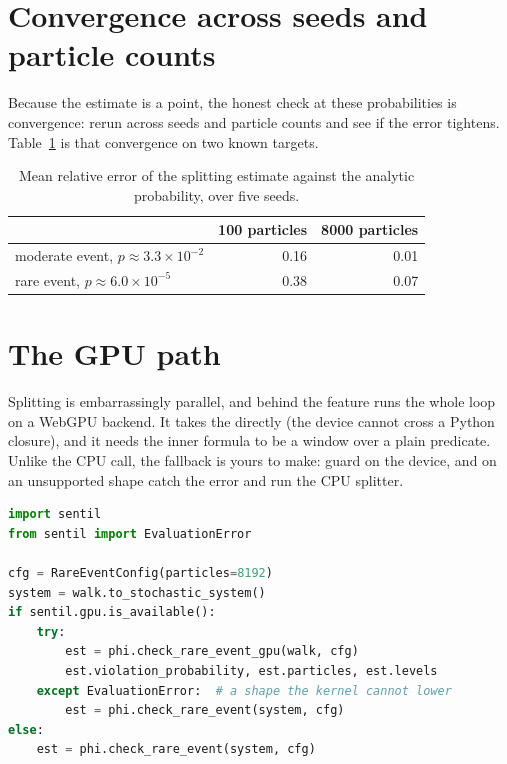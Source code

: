 \section{Convergence across seeds and particle counts}

Because the estimate is a point, the honest check at these probabilities is convergence: rerun across seeds and particle counts and see if the error tightens. Table~\ref{tab:particles} is that convergence on two known targets.

\begin{table}[h]
\centering\small
\renewcommand{\arraystretch}{1.25}
\begin{tabular}{@{}l r r@{}}
\toprule
& \textbf{100 particles} & \textbf{8000 particles}\\
\midrule
moderate event, $p \approx 3.3\times10^{-2}$ & 0.16 & 0.01\\
rare event, $p \approx 6.0\times10^{-5}$ & 0.38 & 0.07\\
\bottomrule
\end{tabular}
\caption{Mean relative error of the splitting estimate against the analytic probability, over five seeds.}
\label{tab:particles}
\end{table}

\section{The GPU path}

Splitting is embarrassingly parallel, and behind the  feature \sentil{} runs the whole loop on a WebGPU backend. It takes the  directly (the device cannot cross a Python closure), and it needs the inner formula to be a  window over a plain predicate. Unlike the CPU call, the fallback is yours to make: guard on the device, and on an unsupported shape catch the error and run the CPU splitter.

\begin{lstlisting}[language=Python]
import sentil
from sentil import EvaluationError

cfg = RareEventConfig(particles=8192)
system = walk.to_stochastic_system()
if sentil.gpu.is_available():
    try:
        est = phi.check_rare_event_gpu(walk, cfg)
        est.violation_probability, est.particles, est.levels
    except EvaluationError:  # a shape the kernel cannot lower
        est = phi.check_rare_event(system, cfg)
else:
    est = phi.check_rare_event(system, cfg)
\end{lstlisting}

